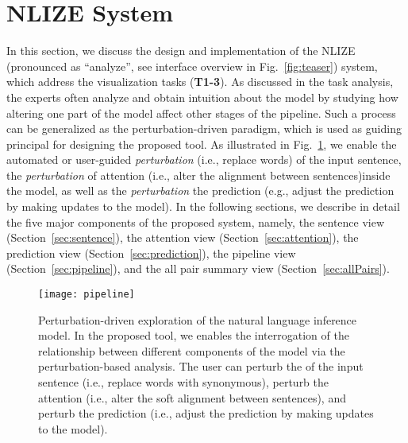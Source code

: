 \section{NLIZE System}
In this section, we discuss the design and implementation of the NLIZE (pronounced as ``analyze'', see interface overview in Fig.~\ref{fig:teaser}) system, which address the visualization tasks (\textbf{T1-3}).
%
As discussed in the task analysis, the experts often analyze and obtain intuition about the model by studying how altering one part of the model affect other stages of the pipeline.
%
Such a process can be generalized as the perturbation-driven paradigm, which is used as guiding principal for designing the proposed tool.
%
As illustrated in Fig.~\ref{fig:modelPipeline}, we enable the automated or user-guided \emph{perturbation} (i.e., replace words) of the input sentence, the \emph{perturbation} of attention (i.e., alter the alignment between sentences)inside the model, as well as the \emph{perturbation} the prediction (e.g., adjust the prediction by making updates to the model).
%
In the following sections, we describe in detail the five major components of the proposed system, namely, the sentence view  (Section~\ref{sec:sentence}), the attention view (Section~\ref{sec:attention}), the prediction view (Section~\ref{sec:prediction}), the pipeline view (Section~\ref{sec:pipeline}), and the all pair summary view (Section~\ref{sec:allPairs}).


\begin{figure}[htbp]
\centering
 \texttt{[image: pipeline]}
 \caption{
 Perturbation-driven exploration of the natural language inference model.
 In the proposed tool, we enables the interrogation of the relationship between different components of the model via the perturbation-based analysis.
 The user can perturb the of the input sentence (i.e., replace words with synonymous), perturb the attention (i.e., alter the soft alignment between sentences), and perturb the prediction (i.e., adjust the prediction by making updates to the model).
}
\label{fig:modelPipeline}
\end{figure}

%

